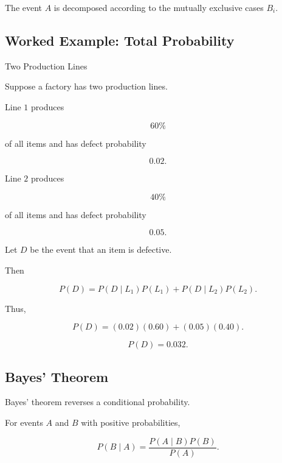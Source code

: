 The event \(A\) is decomposed according to the mutually exclusive cases
\(B_i\).

\subsection{Worked Example: Total Probability}
\label{subsec:worked-total-probability}

\begin{workedexamplebox}{Two Production Lines}

Suppose a factory has two production lines.

Line \(1\) produces

\[
60\%
\]

of all items and has defect probability

\[
0.02.
\]

Line \(2\) produces

\[
40\%
\]

of all items and has defect probability

\[
0.05.
\]

Let \(D\) be the event that an item is defective.

Then

\[
P(D)
=
P(D\mid L_1)P(L_1)
+
P(D\mid L_2)P(L_2).
\]

Thus,

\[
P(D)
=
(0.02)(0.60)
+
(0.05)(0.40).
\]

\begin{answerbox}
\[
\boxed{
P(D)=0.032.
}
\]
\end{answerbox}

\end{workedexamplebox}

\subsection{Bayes' Theorem}
\label{subsec:bayes-theorem}

Bayes' theorem reverses a conditional probability.

\begin{theorem}
For events \(A\) and \(B\) with positive probabilities,

\[
\boxed{
P(B\mid A)
=
\frac{
P(A\mid B)P(B)
}{
P(A)
}.
}
\]
\end{theorem}

